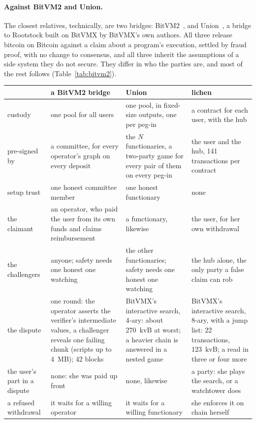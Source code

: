 \documentclass[11pt]{article}
\begin{document}
\paragraph{Against BitVM2 and Union.} The closest relatives,
technically, are two bridges: BitVM2~\cite{bitvm2usenix}, and
Union~\cite{union}, a bridge to Rootstock built on BitVMX by BitVMX's
own authors. All three release bitcoin on Bitcoin against a claim about
a program's execution, settled by fraud proof, with no change to
consensus, and all three inherit the assumptions of a side system they
do not secure. They differ in who the parties are, and most of the rest
follows (Table~\ref{tab:bitvm2}).

\begin{table}[!tp]
\centering
\small
\begin{tabularx}{\linewidth}{>{\raggedright\arraybackslash}p{21mm}LLL}
\toprule
& a BitVM2 bridge & Union & lichen \\
\midrule
custody & one pool for all users & one pool, in fixed-size outputs, one per peg-in & a contract for each user, with the hub \\
pre-signed by & a committee, for every operator's graph on every deposit & the $N$ functionaries, a two-party game for every pair of them on every peg-in & the user and the hub, 141 transactions per contract \\
setup trust & one honest committee member & one honest functionary & none \\
the claimant & an operator, who paid the user from its own funds and claims reimbursement & a functionary, likewise & the user, for her own withdrawal \\
the challengers & anyone; safety needs one honest one watching & the other functionaries; safety needs one honest one watching & the hub alone, the only party a false claim can rob \\
the dispute & one round: the operator asserts the verifier's intermediate values, a challenger reveals one failing chunk (scripts up to 4~MB); 42 blocks & BitVMX's interactive search, 4-ary: about 270~kvB at worst; a heavier chain is answered in a nested game & BitVMX's interactive search, 8-ary, with a jump list: 22 transactions, 123~kvB; a read in three or four more \\
the user's part in a dispute & none: she was paid up front & none, likewise & a party: she plays the search, or a watchtower does \\
a refused withdrawal & it waits for a willing operator & it waits for a willing functionary & she enforces it on chain herself \\

\end{tabularx}
\end{table}
\end{document}
